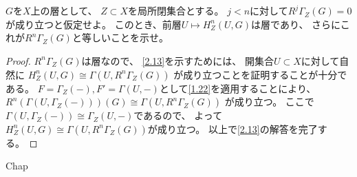 \documentclass[uplatex,dvipdfmx]{jsarticle}
\begin{document}
\maketitle
\HeaderCommentA
\section{}

\fi


\begin{prob}\label{2.13}
  \(G\)を\(X\)上の層として、
  \(Z\subset X\)を局所閉集合とする。
  \(j<n\)に対して\(R^j\Gamma_Z(G)=0\)が成り立つと仮定せよ。
  このとき、前層\(U\mapsto H^n_Z(U,G)\)は層であり、
  さらにこれが\(R^n\Gamma_Z(G)\)と等しいことを示せ。
\end{prob}

\begin{proof}
  \(R^n\Gamma_Z(G)\)は層なので、
  \autoref{2.13}を示すためには、
  開集合\(U\subset X\)に対して自然に
  \(H^n_Z(U,G)\cong \Gamma(U,R^n\Gamma_Z(G))\)
  が成り立つことを証明することが十分である。
  \(F=\Gamma_Z(-), F'=\Gamma(U,-)\)として\autoref{1.22}を適用することにより、
  \(R^n(\Gamma(U,\Gamma_Z(-)))(G)\cong \Gamma(U,R^n\Gamma_Z(G))\)
  が成り立つ。
  ここで\(\Gamma(U,\Gamma_Z(-))\cong \Gamma_Z(U,-)\)であるので、
  よって\(H^n_Z(U,G)\cong \Gamma(U,R^n\Gamma_Z(G))\)が成り立つ。
  以上で\autoref{2.13}の解答を完了する。
\end{proof}





\ifcsname Chap\endcsname\else
\printbibliography
\end{document}
